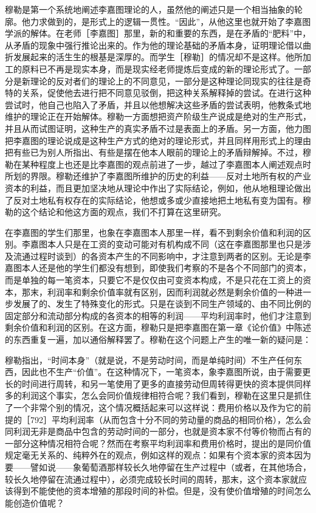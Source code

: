 穆勒是第一个系统地阐述李嘉图理论的人，虽然他的阐述只是一个相当抽象的轮廓。他力求做到的，是形式上的逻辑一贯性。“因此”，从他这里也就开始了李嘉图学派的解体。在老师［李嘉图］那里，新的和重要的东西，是在矛盾的“肥料”中，从矛盾的现象中强行推论出来的。作为他的理论基础的矛盾本身，证明理论借以曲折发展起来的活生生的根基是深厚的。而学生［穆勒］的情况却不是这样。他所加工的原料已不再是现实本身，而是现实经老师提炼后变成的新的理论形式了。一部分是新理论的反对者们的理论上的不同意见，一部分是这种理论同现实的往往是奇特的关系，促使他去进行把不同意见驳倒，把这种关系解释掉的尝试。在进行这种尝试时，他自己也陷入了矛盾，并且以他想解决这些矛盾的尝试表明，他教条式地维护的理论正在开始解体。穆勒一方面想把资产阶级生产说成是绝对的生产形式，并且从而试图证明，这种生产的真实矛盾不过是表面上的矛盾。另一方面，他力图把李嘉图的理论说成是这种生产方式的绝对的理论形式，并且同样用形式上的理由把有些已为别人所指出、有些是摆在他本人眼前的理论上的矛盾辩解掉。不过，穆勒在某种程度上也还是比李嘉图的观点前进了一步，越过了李嘉图本人阐述观点时所划的界限。穆勒还维护了李嘉图所维护的历史的利益——反对土地所有权的产业资本的利益，而且更加坚决地从理论中作出了实际结论，例如，他从地租理论做出了反对土地私有权存在的实际结论，他想或多或少直接地把土地私有变为国有。穆勒的这个结论和他这方面的观点，我们不打算在这里研究。


在李嘉图的学生们那里，也象在李嘉图本人那里一样，看不到剩余价值和利润的区别。李嘉图本人只是在工资的变动可能对有机构成不同（这在李嘉图那里也只是涉及流通过程时谈到）的各资本产生的不同影响中，才注意到两者的区别。无论是李嘉图本人还是他的学生们都没有想到，即使我们考察的不是各个不同部门的资本，而是单独的每一笔资本，只要它不是仅仅由可变资本构成，不是只花在工资上的资本，那末，利润率和剩余价值率就有区别，因而利润就必然是剩余价值的一种进一步发展了的、发生了特殊变化的形式。只是在谈到不同生产领域的、由不同比例的固定部分和流动部分构成的各资本的相等的利润——平均利润率时，他们才注意到剩余价值和利润的区别。在这方面，穆勒只是把李嘉图在第一章《论价值》中陈述的东西重复一遍，加以通俗解释罢了。穆勒在这个问题上产生的唯一新的疑问是：

穆勒指出，“时间本身”（就是说，不是劳动时间，而是单纯时间）不生产任何东西，因此也不生产“价值”。在这种情况下，一笔资本，象李嘉图所说，由于需要更长的时间进行周转，和另一笔使用了更多的直接劳动但周转得更快的资本提供同样多的利润这个事实，怎么会同价值规律相符合呢？我们看到，穆勒在这里只是抓住了一个非常个别的情况，这个情况概括起来可以这样说：费用价格以及作为它的前提的［792］平均利润率（从而包含十分不同的劳动量的商品的相同价格），怎么会同利润无非是商品中包含的劳动时间的一部分，也就是资本家不付等价物而占有的一部分这种情况相符合呢？然而在考察平均利润率和费用价格时，提出的是同价值规定毫无关系的、纯粹外在的观点，例如这样的观点：如果有个资本家的资本因为要——譬如说——象葡萄酒那样较长久地停留在生产过程中（或者，在其他场合，较长久地停留在流通过程中），必须完成较长时间的周转，那末，这个资本家就应该得到不能使他的资本增殖的那段时间的补偿。但是，没有使价值增殖的时间怎么能创造价值呢？

